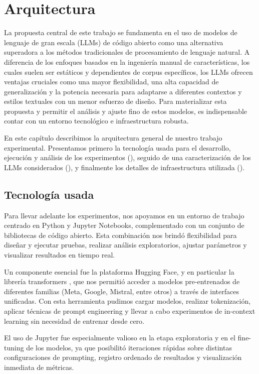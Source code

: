 \section{Arquitectura}\label{sec:Arquitectura}
La propuesta central de este trabajo se fundamenta en el uso de modelos de lenguaje de gran escala (LLMs) de código abierto como una alternativa superadora a los métodos tradicionales de procesamiento de lenguaje natural. A diferencia de los enfoques basados en la ingeniería manual de características, los cuales suelen ser estáticos y dependientes de corpus específicos, los LLMs ofrecen ventajas cruciales como una mayor flexibilidad, una alta capacidad de generalización y la potencia necesaria para adaptarse a diferentes contextos y estilos textuales con un menor esfuerzo de diseño. Para materializar esta propuesta y permitir el análisis y ajuste fino de estos modelos, es indispensable contar con un entorno tecnológico e infraestructura robusta.

En este capítulo describimos la arquitectura general de nuestro trabajo experimental. Presentamos primero la tecnología usada para el desarrollo, ejecución y análisis de los experimentos (), seguido de una caracterización de los LLMs considerados (), y finalmente los detalles de infraestructura utilizada ().

\subsection{Tecnología usada}\label{subsec:stack}
Para llevar adelante los experimentos, nos apoyamos en un entorno de trabajo centrado en Python y Jupyter Notebooks, complementado con un conjunto de bibliotecas de código abierto. Esta combinación nos brindó flexibilidad para diseñar y ejecutar pruebas, realizar análisis exploratorios, ajustar parámetros y visualizar resultados en tiempo real.

Un componente esencial fue la plataforma Hugging Face, y en particular la librería transformers \parencite{transformers}, que nos permitió acceder a modelos pre-entrenados de diferentes familias (Meta, Google, Mistral, entre otros) a través de interfaces unificadas. Con esta herramienta pudimos cargar modelos, realizar tokenización, aplicar técnicas de prompt engineering y llevar a cabo experimentos de in-context learning sin necesidad de entrenar desde cero.

El uso de Jupyter fue especialmente valioso en la etapa exploratoria y en el fine-tuning de los modelos, ya que posibilitó iteraciones rápidas sobre distintas configuraciones de prompting, registro ordenado de resultados y visualización inmediata de métricas.

